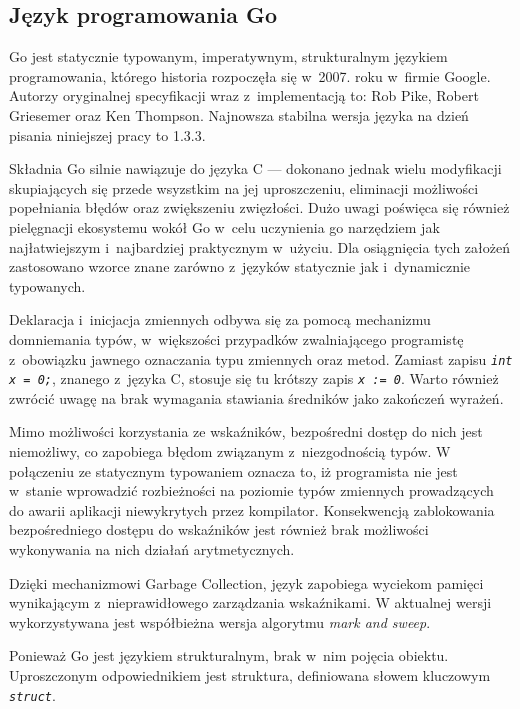 \subsection{Język programowania Go} %
\label{ss_internals_go}
\par{
Go jest statycznie typowanym, imperatywnym, strukturalnym językiem programowania, którego historia rozpoczęła się w~2007. roku w~firmie Google. Autorzy oryginalnej specyfikacji wraz z~implementacją to: Rob Pike, Robert Griesemer oraz Ken Thompson.
Najnowsza stabilna wersja języka na dzień pisania niniejszej pracy to 1.3.3.
}
\par{
Składnia Go silnie nawiązuje do języka C --- dokonano jednak wielu modyfikacji skupiających się przede wsyzstkim na jej uproszczeniu, eliminacji możliwości popełniania błędów oraz zwiększeniu zwięzłości.
Dużo uwagi poświęca się również pielęgnacji ekosystemu wokół Go w~celu uczynienia go narzędziem jak najłatwiejszym i~najbardziej praktycznym w~użyciu.
Dla osiągnięcia tych założeń zastosowano wzorce znane zarówno z~języków statycznie jak i~dynamicznie typowanych.
}
\par{Deklaracja i~inicjacja zmiennych odbywa się za pomocą mechanizmu domniemania typów, w~większości przypadków zwalniającego programistę z~obowiązku jawnego oznaczania typu zmiennych oraz metod. Zamiast zapisu \textit{\lstinline{int x = 0;}}, znanego z~języka C, stosuje się tu krótszy zapis \textit{\lstinline{x := 0}}. Warto również zwrócić uwagę na brak wymagania stawiania średników jako zakończeń wyrażeń.
}
 \par{Mimo możliwości korzystania ze wskaźników, bezpośredni dostęp do nich jest niemożliwy, co zapobiega błędom związanym z~niezgodnością typów. W połączeniu ze statycznym typowaniem oznacza to, iż programista nie jest w~stanie wprowadzić rozbieżności na poziomie typów zmiennych prowadzących do awarii aplikacji niewykrytych przez kompilator. Konsekwencją zablokowania bezpośredniego dostępu do wskaźników jest również brak możliwości wykonywania na nich działań arytmetycznych.
 }
 \par{
Dzięki mechanizmowi Garbage Collection, język zapobiega wyciekom pamięci wynikającym z~nieprawidłowego zarządzania wskaźnikami. W aktualnej wersji wykorzystywana jest współbieżna wersja algorytmu \textit{mark and sweep}.
}
\par{
 Ponieważ Go jest językiem strukturalnym, brak w~nim pojęcia obiektu. Uproszczonym odpowiednikiem jest struktura, definiowana słowem kluczowym \textit{\lstinline{struct}}.
}
